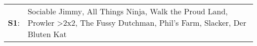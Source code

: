 \begin{supertabular}{p{0.03\textwidth}p{0.92\textwidth}}
 \textbf{S1}:  &  Sociable Jimmy\textsuperscript{}, \enspace All Things Ninja\textsuperscript{}, \enspace Walk the Proud Land\textsuperscript{}, \enspace Prowler\textsuperscript{} \textgreater \enspace 2x2\textsuperscript{}, \enspace The Fussy Dutchman\textsuperscript{}, \enspace Phil's Farm\textsuperscript{}, \enspace Slacker\textsuperscript{}, \enspace Der Bluten Kat\textsuperscript{}  \enspace  \\
\end{supertabular}
